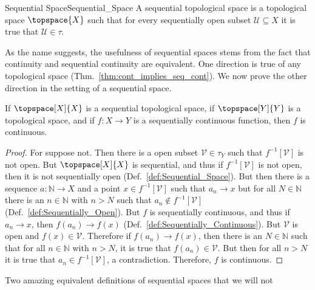         \begin{fdefinition}{Sequential Space}{Sequential_Space}
            A sequential topological space is a topological space
            $\topspace{X}$ such that for every sequentially open subset
            $\mathcal{U}\subseteq{X}$ it is true that $\mathcal{U}\in\tau$.
        \end{fdefinition}
        As the name suggests, the usefulness of sequential spaces stems from the
        fact that continuity and sequential continuity are equivalent. One
        direction is true of any topological space
        (Thm.~\ref{thm:cont_implies_seq_cont}). We now prove the other direction
        in the setting of a sequential space.
        \begin{theorem}
            \label{thm:seq_space_seq_cont_eqiv_cont}%
            If $\topspace[X]{X}$ is a sequential topological space, if
            $\topspace[Y]{Y}$ is a topological space, and if $f:X\rightarrow{Y}$
            is a sequentially continuous function, then $f$ is continuous.
        \end{theorem}
        \begin{proof}
            For suppose not. Then there is a open subset
            $\mathcal{V}\in\tau_{Y}$ such that $f^{\minus{1}}[\mathcal{V}]$ is
            not open. But $\topspace[X]{X}$ is sequential, and thus if
            $f^{\minus{1}}[\mathcal{V}]$ is not open, then it is not
            sequentially open (Def.~\ref{def:Sequential_Space}). But then there
            is a sequence $a:\mathbb{N}\rightarrow{X}$ and a point
            $x\in{f}^{\minus{1}}[\mathcal{V}]$ such that $a_{n}\rightarrow{x}$
            but for all $N\in\mathbb{N}$ there is an $n\in\mathbb{N}$ with
            $n>N$ such that $a_{n}\notin{f}^{\minus{1}}[\mathcal{V}]$
            (Def.~\ref{def:Sequentially_Open}). But $f$ is sequentially
            continuous, and thus if $a_{n}\rightarrow{x}$, then
            $f(a_{n})\rightarrow{f}(x)$
            (Def.~\ref{def:Sequentially_Continuous}). But $\mathcal{V}$ is open
            and $f(x)\in\mathcal{V}$. Therefore if $f(a_{n})\rightarrow{f}(x)$,
            then there is an $N\in\mathbb{N}$ such that for all $n\in\mathbb{N}$
            with $n>N$, it is true that $f(a_{n})\in\mathcal{V}$. But then for
            all $n>N$ it is true that $a_{n}\in{f}^{\minus{1}}[\mathcal{V}]$, a
            contradiction. Therefore, $f$ is continuous.
        \end{proof}
        Two amazing equivalent definitions of sequential spaces that we will not
